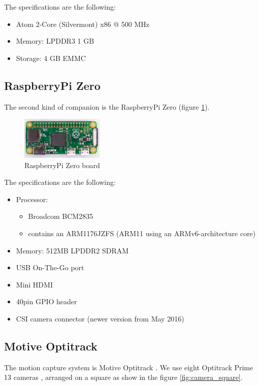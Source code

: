The specifications are the following:

\begin{itemize}
  \item Atom 2-Core (Silvermont) x86 @ 500 MHz
  \item Memory: LPDDR3 1 GB
  \item Storage: 4 GB EMMC
\end{itemize}

\subsection{RaspberryPi Zero}
The second kind of companion is the RaspberryPi Zero \cite{raspberry}
(figure \ref{fig:hardware_raspberry}).

\begin{figure}[h]
\centering
\includegraphics[width=0.35\textwidth]{chapters/chapter-03/figures/hardware_raspberry.jpg}
\caption{RaspberryPi Zero board}
\label{fig:hardware_raspberry}
\end{figure}

The specifications are the following:

\begin{itemize}
  \item Processor:
        \begin{itemize}
          \item Broadcom BCM2835
          \item contains an ARM1176JZFS (ARM11 using an ARMv6-architecture core)
        \end{itemize}

  \item Memory: 512MB LPDDR2 SDRAM

  \item USB On-The-Go port
  \item Mini HDMI
  \item 40pin GPIO header
  \item CSI camera connector (newer version from May 2016)
\end{itemize}

\subsection{Motive Optitrack}
The motion capture system is Motive Optitrack \cite{optitrack}.
We use eight Optitrack Prime 13 cameras \cite{prime13},
arranged on a square as show in the figure \ref{fig:camera_square}.

